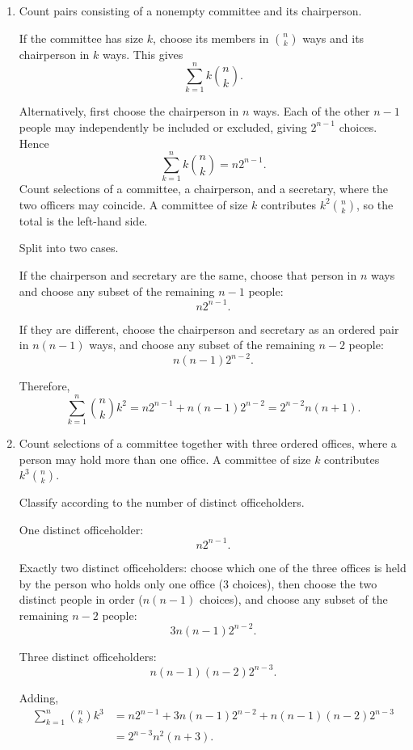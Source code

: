 \documentclass[11pt]{article}
\newenvironment{solution}{
    \par
    \begin{tcolorbox}[
        colback=white,
        colframe=uwgold,
        boxrule=0.7pt,
        arc=2mm,
        left=3mm,
        right=3mm,
        top=2mm,
        bottom=2mm,
        breakable,
        before skip=0.5em,
        after skip=1em,
        title=\textbf{Solution},
        coltitle=uwpurple,
        fonttitle=\bfseries
    ]
}{
    \end{tcolorbox}
}
\begin{document}
\begin{solution}
\begin{enumerate}[label=(\alph*)]
    \item Count pairs consisting of a nonempty committee and its chairperson.

    If the committee has size \(k\), choose its members in \(\binom nk\) ways and its chairperson in \(k\) ways. This gives
    \[
    \sum_{k=1}^{n}k\binom nk.
    \]

    Alternatively, first choose the chairperson in \(n\) ways. Each of the other \(n-1\) people may independently be included or excluded, giving \(2^{n-1}\) choices. Hence
    \[
    \sum_{k=1}^{n}k\binom nk=n2^{n-1}.
    \]
Count selections of a committee, a chairperson, and a secretary, where the two officers may coincide. A committee of size \(k\) contributes \(k^2\binom nk\), so the total is the left-hand side.

    Split into two cases.

    If the chairperson and secretary are the same, choose that person in \(n\) ways and choose any subset of the remaining \(n-1\) people:
    \[
    n2^{n-1}.
    \]

    If they are different, choose the chairperson and secretary as an ordered pair in \(n(n-1)\) ways, and choose any subset of the remaining \(n-2\) people:
    \[
    n(n-1)2^{n-2}.
    \]

    Therefore,
    \[
    \sum_{k=1}^{n}\binom nk k^2
    =
    n2^{n-1}+n(n-1)2^{n-2}
    =
    2^{n-2}n(n+1).
    \]

    \item Count selections of a committee together with three ordered offices, where a person may hold more than one office. A committee of size \(k\) contributes \(k^3\binom nk\).

    Classify according to the number of distinct officeholders.

    One distinct officeholder:
    \[
    n2^{n-1}.
    \]

    Exactly two distinct officeholders: choose which one of the three offices is held by the person who holds only one office (\(3\) choices), then choose the two distinct people in order (\(n(n-1)\) choices), and choose any subset of the remaining \(n-2\) people:
    \[
    3n(n-1)2^{n-2}.
    \]

    Three distinct officeholders:
    \[
    n(n-1)(n-2)2^{n-3}.
    \]

    Adding,
    \begin{align*}
    \sum_{k=1}^{n}\binom nk k^3
    &=
    n2^{n-1}
    +3n(n-1)2^{n-2}
    +n(n-1)(n-2)2^{n-3}\\
    &=
    2^{n-3}n^2(n+3).
    \end{align*}
\end{enumerate}
\end{solution}
 
\end{document}

